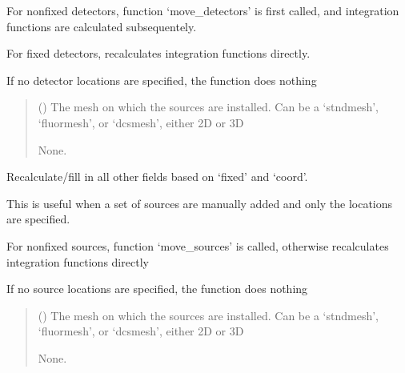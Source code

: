 \documentclass[letterpaper,10pt,english]{sphinxmanual}
\begin{document}
\begin{fulllineitems}
\begin{fulllineitems}
\sphinxAtStartPar
For non\sphinxhyphen{}fixed detectors, function ‘move\_detectors’ is first called, and integration functions are calculated subsequentely.

\sphinxAtStartPar
For fixed detectors, recalculates integration functions directly.

\sphinxAtStartPar
If no detector locations are specified, the function does nothing
\begin{quote}\begin{description}
\sphinxAtStartPar
{} () \textendash{} The mesh on which the sources are installed. Can be a ‘stndmesh’, ‘fluormesh’, or ‘dcsmesh’, either 2D or 3D

\sphinxAtStartPar
None.

\end{description}\end{quote}

\end{fulllineitems}


\begin{fulllineitems}
\label{\detokenize{_autosummary/nirfasterff.base.optodes.optode:nirfasterff.base.optodes.optode.touch_sources}}
\pysigstartsignatures
\pysiglinewithargsret
{}
{}
{}
\pysigstopsignatures
\sphinxAtStartPar
Recalculate/fill in all other fields based on ‘fixed’ and ‘coord’.

\sphinxAtStartPar
This is useful when a set of sources are manually added and only the locations are specified.

\sphinxAtStartPar
For non\sphinxhyphen{}fixed sources, function ‘move\_sources’ is called, otherwise recalculates integration functions directly

\sphinxAtStartPar
If no source locations are specified, the function does nothing
\begin{quote}\begin{description}
\sphinxAtStartPar
{} () \textendash{} The mesh on which the sources are installed. Can be a ‘stndmesh’, ‘fluormesh’, or ‘dcsmesh’, either 2D or 3D

\sphinxAtStartPar
None.

\end{description}\end{quote}

\end{fulllineitems}


\end{fulllineitems}
\end{document}
